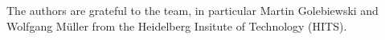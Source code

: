 The authors are grateful to the \SABIO team, in particular Martin Golebiewski and Wolfgang M\"uller from the Heidelberg Insitute of Technology (HITS).

%
